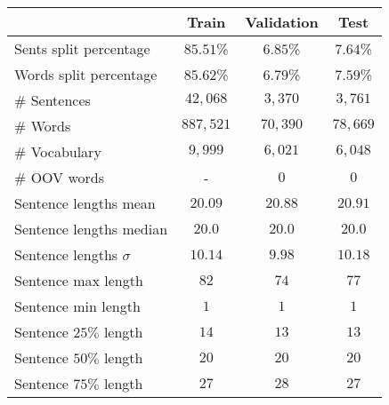 \begin{tabular}{lccc}
    \toprule
    & \textbf{Train} & \textbf{Validation} & \textbf{Test} \\
    \midrule
    Sents split percentage & 
    \(85.51\)\% & \(6.85\)\% & \(7.64\)\%  \\
    Words split percentage & 
    \(85.62\)\% & \(6.79\)\% & \(7.59\)\%  \\
    \# Sentences & 
    \(42,068\) & \(3,370\) & \(3,761\) \\
    \# Words & 
    \(887,521\) & \(70,390\) & \(78,669\) \\ 
    \# Vocabulary & 
    \(9,999\) & \(6,021\) & \(6,048\) \\
    \# OOV words & 
    - & \(0\) & \(0\) \\
    \midrule
    Sentence lengths mean & 
    \(20.09\) & \(20.88\) & \(20.91\) \\
    Sentence lengths median & 
    \(20.0\) & \(20.0\) & \(20.0\) \\
    Sentence lengths \(\sigma\) &
    \(10.14\) & \(9.98\) & \(10.18\) \\
    Sentence max length & 
    \(82\) & \(74\) & \(77\) \\
    Sentence min length & 
    \(1\) & \(1\) & \(1\) \\
    Sentence \(25\%\) length & 
    \(14\) & \(13\) & \(13\) \\
    Sentence \(50\%\) length & 
    \(20\) & \(20\) & \(20\) \\
    Sentence \(75\%\) length & 
    \(27\) & \(28\) & \(27\) \\

    \bottomrule
\end{tabular}